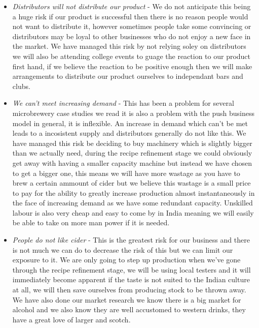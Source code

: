 \documentclass[11pt]{article}
\begin{document}
\begin{itemize}
\item \emph{Distributors will not distribute our product} - We do not
anticipate this being a huge risk if our product is successful then there is no
reason people would not want to distribute it, however sometimes people take
some convincing or distributors may be loyal to other businesses who do not
enjoy a new face in the market. We have managed this risk by not relying soley
on distributors we will also be attending college events to guage the reaction
to our product first hand, if we believe the reaction to be positive enough then
we will make arrangements to distribute our product ourselves to independant
bars and clubs.
\item \emph{We can't meet increasing demand} - This has been a problem for
several microbrewery case studies we read it is also a problem with the push
business model in general, it is inflexible. An increase in demand which can't
be met leads to a incosistent supply and distributors generally do not like
this. We have managed this risk be deciding to buy machinery which is slightly
bigger than we actually need, during the recipe refinement stage we could
obviously get away with having a smaller capacity machine but instead we have
chosen to get a bigger one, this means we will have more wastage as you have to
brew a certain ammount of cider but we believe this wastage is a small price to
pay for the ability to greatly increase production almost instantaneously in the
 face of increasing demand as we have some redundant capacity. Unskilled labour
is also very cheap and easy to come by in India meaning we will easily be able
to take on more man power if it is needed.
\item \emph{People do not like cider} - This is the greatest risk for our
business and there is not much we can do to decrease the risk of this but we can
limit our exposure to it. We are only going to step up production when we've
gone through the recipe refinement stage, we will be using local testers and it
will immediately become apparent if the taste is not suited to the Indian
culture at all, we will then save ourselves from producing stock to be thrown
away. We have also done our market research we know there is a big market for
alcohol and we also know they are well accustomed to western drinks, they have a
great love of larger and scotch.
\end{itemize}

\newpage

\end{document}
